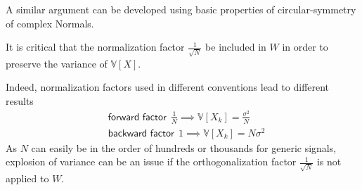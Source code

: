 A similar argument can be developed using basic properties of circular-symmetry of complex Normals.



It is critical that the normalization factor $\frac{1}{\sqrt{N}}$ be included in $W$ in order to preserve the variance of $\mathbb{V}[X]$.

Indeed, normalization factors used in different conventions lead to different results
$$
\begin{aligned}
&\textsf{forward factor}~~\frac{1}{N} \implies \mathbb{V}[X_k] = \frac{\sigma^2}{N} \\
&\textsf{backward factor}~~1 \implies \mathbb{V}[X_k] = N \sigma^2
    \end{aligned}
$$
As $N$ can easily be in the order of hundreds or thousands for generic signals, explosion of variance can be an issue if the orthogonalization factor $\frac{1}{\sqrt{N}}$ is not applied to $W$.
%
